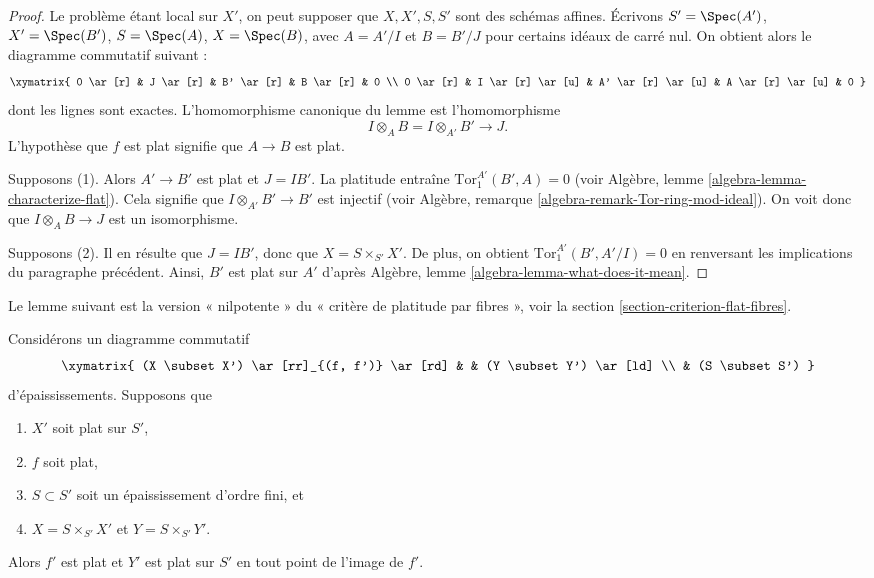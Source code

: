 \begin{proof}
Le problème étant local sur $X'$, on peut supposer que $X, X', S, S'$
sont des schémas affines. Écrivons $S' = \Spec(A')$, $X' = \Spec(B')$,
$S = \Spec(A)$, $X = \Spec(B)$, avec $A = A'/I$ et $B = B'/J$
pour certains idéaux de carré nul. On obtient alors le diagramme commutatif
suivant :
$$
\xymatrix{
0 \ar[r] &
J \ar[r] &
B' \ar[r] &
B \ar[r] & 0 \\
0 \ar[r] &
I \ar[r] \ar[u] &
A' \ar[r] \ar[u] &
A \ar[r] \ar[u] & 0
}
$$
dont les lignes sont exactes. L'homomorphisme canonique du lemme est l'homomorphisme
$$
I \otimes_A B = I \otimes_{A'} B' \longrightarrow J.
$$
L'hypothèse que $f$ est plat signifie que $A \to B$ est plat.

\medskip\noindent
Supposons (1). Alors $A' \to B'$ est plat et $J = IB'$. La platitude entraîne
$\text{Tor}_1^{A'}(B', A) = 0$ (voir
Algèbre, lemme \ref{algebra-lemma-characterize-flat}).
Cela signifie que $I \otimes_{A'} B' \to B'$ est injectif (voir
Algèbre, remarque \ref{algebra-remark-Tor-ring-mod-ideal}).
On voit donc que $I \otimes_A B \to J$ est un isomorphisme.

\medskip\noindent
Supposons (2). Il en résulte que $J = IB'$, donc que $X = S \times_{S'} X'$.
De plus, on obtient $\text{Tor}_1^{A'}(B', A'/I) = 0$ en renversant
les implications du paragraphe précédent. Ainsi, $B'$ est plat sur $A'$ d'après
Algèbre, lemme \ref{algebra-lemma-what-does-it-mean}.
\end{proof}

\noindent
Le lemme suivant est la version « nilpotente » du
« critère de platitude par fibres », voir
la section \ref{section-criterion-flat-fibres}.

\begin{lemma}
\label{lemma-flatness-morphism-thickenings}
Considérons un diagramme commutatif
$$
\xymatrix{
(X \subset X') \ar[rr]_{(f, f')} \ar[rd] & & (Y \subset Y') \ar[ld] \\
& (S \subset S')
}
$$
d'épaississements. Supposons que
\begin{enumerate}
\item $X'$ soit plat sur $S'$,
\item $f$ soit plat,
\item $S \subset S'$ soit un épaississement d'ordre fini, et
\item $X = S \times_{S'} X'$ et $Y = S \times_{S'} Y'$.
\end{enumerate}
Alors $f'$ est plat et $Y'$ est plat sur $S'$ en tout point de
l'image de $f'$.
\end{lemma}

